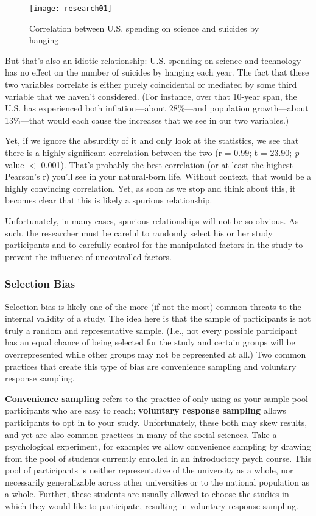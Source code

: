 \begin{figure}[htp]
\texttt{[image: research01]}
\caption{Correlation between U.S. spending on science and suicides by hanging}
\label{fig:research02}
\end{figure}

But that's also an idiotic relationship: U.S. spending on science and technology has no effect on the number of suicides by hanging each year. The fact that these two variables correlate is either purely coincidental or mediated by some third variable that we haven't considered. (For instance, over that 10-year span, the U.S. has experienced both inflation---about 28\%---and population growth---about 13\%---that would each cause the increases that we see in our two variables.)

Yet, if we ignore the absurdity of it and only look at the statistics, we see that there is a highly significant correlation between the two (r = 0.99; t = 23.90; \textit{p}-value $<$ 0.001). That's probably the best correlation (or at least the highest Pearson's r) you'll see in your natural-born life. Without context, that would be a highly convincing correlation. Yet, as soon as we stop and think about this, it becomes clear that this is likely a spurious relationship.

Unfortunately, in many cases, spurious relationships will not be so obvious. As such, the researcher must be careful to randomly select his or her study participants and to carefully control for the manipulated factors in the study to prevent the influence of uncontrolled factors.

\subsubsection{Selection Bias}
Selection bias is likely one of the more (if not the most) common threats to the internal validity of a study. The idea here is that the sample of participants is not truly a random and representative sample. (I.e., not every possible participant has an equal chance of being selected for the study and certain groups will be overrepresented while other groups may not be represented at all.) Two common practices that create this type of bias are convenience sampling and voluntary response sampling.

\textbf{Convenience sampling} refers to the practice of only using as your sample pool participants who are easy to reach; \textbf{voluntary response sampling} allows participants to opt in to your study. Unfortunately, these both may skew results, and yet are also common practices in many of the social sciences. Take a psychological experiment, for example: we allow convenience sampling by drawing from the pool of students currently enrolled in an introductory psych course. This pool of participants is neither representative of the university as a whole, nor necessarily generalizable across other universities or to the national population as a whole. Further, these students are usually allowed to choose the studies in which they would like to participate, resulting in voluntary response sampling.

